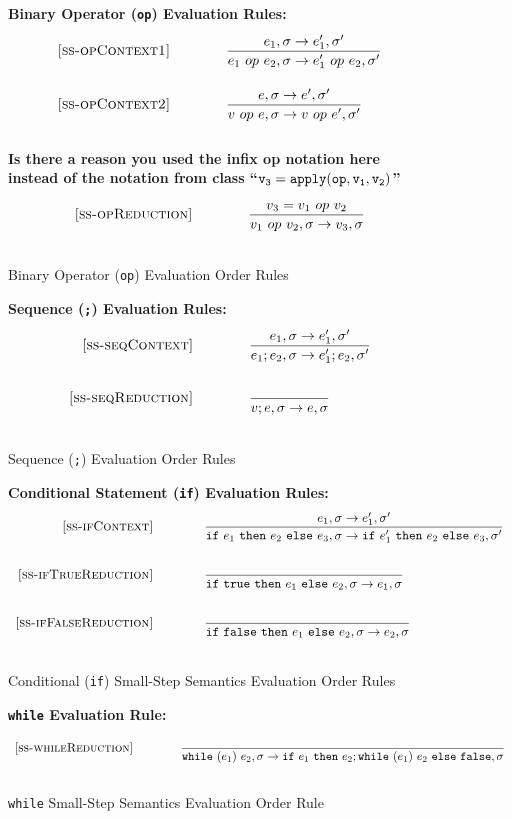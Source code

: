 \documentclass{article}
\newcommand{\ife}[3]{\mbox{\tt if}~{#1}~\mbox{\tt then}~{#2}~\mbox{\tt else}~{#3}}
\newcommand{\whilee}[2]{\mbox{\tt while}~(#1)~#2}
\newcommand{\true}{\mbox{\tt true}}
\newcommand{\false}{\mbox{\tt false}}
\begin{document}
\begin{figure}[H]\label{fig:opRules}
\caption{Binary Operator ({\tt op}) Evaluation Order Rules}
{\bf Binary Operator ({\tt op}) Evaluation Rules:}
\[
\\
\begin{array}{r@{\qquad\qquad}l}
\ssrule{ss-opContext1}{
  \sstep{e_1}{\sigma}{e_1'}{\sigma'}
}{
  \sstep{e_1~op~e_2}{\sigma}{e_1'~op~e_2}{\sigma'}
}
\ssrule{ss-opContext2}{
  \sstep{e}{\sigma}{e'}{\sigma'}
}{
  \sstep{v~op~e}{\sigma}{v~op~e'}{\sigma'}
}
\end{array}
\]
{\bf Is there a reason you used the infix op notation here instead of the notation from class ``$\tt v_3 = apply(op, v_1, v_2)$''}
\[
\\
\begin{array}{r@{\qquad\qquad}l}
\ssrule{ss-opReduction}{
  v_3 = v_1 ~op~ v_2
}{
  \sstep{v_1~op~v_2}{\sigma}{v_3}{\sigma}
}
\end{array}
\]
\end{figure}

\begin{figure}[H]\label{fig:seqRules}
\caption{Sequence ({\tt ;}) Evaluation Order Rules}
{\bf Sequence ({\tt ;}) Evaluation Rules:}
\[
\\
\begin{array}{r@{\qquad\qquad}l}
\ssrule{ss-seqContext}{
  \sstep{e_1}{\sigma}{e_1'}{\sigma'}
}{
  \sstep{e_1 ; e_2}{\sigma}{e_1' ; e_2}{\sigma'}
}
\ssrule{ss-seqReduction}{
}{
  \sstep{v ; e}{\sigma}{e}{\sigma}
}
\end{array}
\]
\end{figure}

\begin{figure}[H]\label{fig:condRules}
\caption{Conditional ({\tt if}) Small-Step Semantics Evaluation Order Rules}
{\bf Conditional Statement ({\tt if}) Evaluation Rules:}
\[
\\
\begin{array}{r@{\qquad\qquad}l}
\ssrule{ss-ifContext}{
  \sstep{e_1}{\sigma}{e_1'}{\sigma'}
}{
  \sstep{\ife{e_1}{e_2}{e_3}}{\sigma}{\ife{e_1'}{e_2}{e_3}}{\sigma'}
}
\ssrule{ss-ifTrueReduction}{
}{
  \sstep{\ife{\true}{e_1}{e_2}}{\sigma}{e_1}{\sigma}
}
\ssrule{ss-ifFalseReduction}{
}{
  \sstep{\ife{\false}{e_1}{e_2}}{\sigma}{e_2}{\sigma}
}
\end{array}
\]
\end{figure}

\begin{figure}[H]\label{fig:whileRules}
\caption{{\tt while} Small-Step Semantics Evaluation Order Rule}
{\bf {\tt while} Evaluation Rule:} 
\[
\\
\begin{array}{r@{\qquad\qquad}l}
\ssrule{ss-whileReduction}{
}{
  \sstep{\whilee{e_1}{e_2}}{\sigma}{\ife{e_1}{e_2;\whilee{e_1}{e_2}}{\false}}{\sigma}
}
\end{array}
\]
\end{figure}
\end{document}
